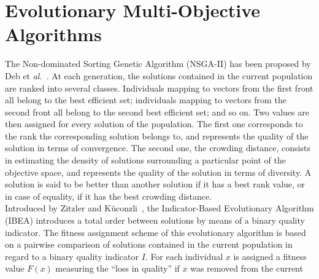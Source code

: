 \documentclass{llncs}
\begin{document}
\section{ Evolutionary Multi-Objective Algorithms}
\label{sec:evolutionaryMOA}
\indent The Non-dominated Sorting Genetic Algorithm (NSGA-II) has been proposed by Deb et \textit{al.}~\cite{Deb2002}. %
At each generation,  the solutions contained in the current  population are ranked into several classes. 
Individuals mapping to vectors from the first front all belong to
the best efficient set; individuals mapping to vectors from the second front all belong to the second best efficient set; and so on.
Two values are then assigned for every solution of the population. The first one corresponds to the rank  the corresponding solution
belongs to, and represents the quality of the solution in terms of convergence. The second one, the crowding distance, consists in
estimating the density of solutions surrounding a particular point of the objective space, and represents the quality of the solution in
terms of diversity.  A solution is said to be better than another solution if it has a best rank value, or in case of equality, if it has
the best crowding distance.\\ %
\indent Introduced by Zitzler and  K\"uconzli~\cite{Zitzler2004}, the Indicator-Based Evolutionary Algorithm (IBEA)%
introduces a total order between solutions by means of a binary quality indicator. 
The fitness assignment scheme of this evolutionary algorithm is based on a pairwise comparison of solutions contained 
in  the current population in regard to a binary quality indicator $I$. For each individual $x$ is assigned a fitness value $F (x)$ measuring the ``loss in quality'' if $x$ was removed from the current
\end{document}
